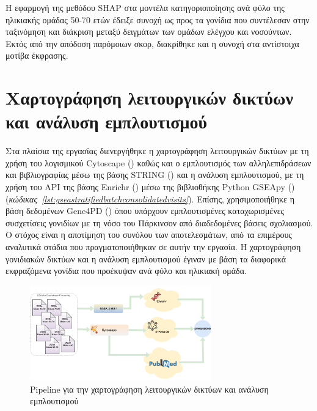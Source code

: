 \documentclass[12pt]{report}
\begin{document}
        \par
            Η εφαρμογή της μεθόδου SHAP στα μοντέλα κατηγοριοποίησης ανά φύλο της ηλικιακής ομάδας 50-70 ετών έδειξε συνοχή ως προς τα γονίδια που συντέλεσαν στην ταξινόμηση και διάκριση μεταξύ δειγμάτων των ομάδων ελέγχου και νοσούντων. Εκτός από την απόδοση παρόμοιων σκορ, διακρίθηκε και η συνοχή στα αντίστοιχα μοτίβα έκφρασης.

    \section{Χαρτογράφηση λειτουργικών δικτύων και ανάλυση εμπλουτισμού}
            Στα πλαίσια της εργασίας διενεργήθηκε η χαρτογράφηση λειτουργικών δικτύων με τη χρήση του λογισμικού Cytoscape (\emph{\cite{Shannon2003Cytoscape:Networks}}) καθώς και ο εμπλουτισμός των αλληλεπιδράσεων και βιβλιογραφίας μέσω της βάσης STRING (\emph{\cite{Szklarczyk2023TheInterest}})  και η ανάλυση εμπλουτισμού, με τη χρήση του API  της βάσης Enrichr (\emph{\cite{Chen2013Enrichr:Tool}}) μέσω της βιβλιοθήκης Python GSEApy (\emph{\cite{Fang2023GSEApy:Python}}) (\emph{κώδικας~\ref{lst:gseastratifiedbatchconsolidatedvisits}}). Επίσης, χρησιμοποιήθηκε η βάση δεδομένων Gene4PD (\emph{\cite{Li2021Gene4PD:Disease}}) όπου υπάρχουν εμπλουτισμένες καταχωρισμένες συσχετίσεις γονιδίων με τη νόσο του Πάρκινσον από διαδεδομένες βάσεις σχολιασμού. Ο στόχος είναι η αποτίμηση του συνόλου των αποτελεσμάτων, από τα επιμέρους αναλυτικά στάδια που πραγματοποιήθηκαν σε αυτήν την εργασία. Η χαρτογράφηση γονιδιακών δικτύων και η ανάλυση εμπλουτισμού έγιναν με βάση τα διαφορικά εκφραζόμενα γονίδια που προέκυψαν ανά φύλο και ηλικιακή ομάδα.

            \begin{figure}[H]
                \centering
                \includegraphics[width=0.7\textwidth]{GSEA/msci-big-pic-GSEA-blocks.png}
                \caption{Pipeline για την χαρτογράφηση λειτουργικών δικτύων και ανάλυση εμπλουτισμού}
                \label{fig:msci-big-pic-GSEA-blocks}
            \end{figure}
    
\end{document}
